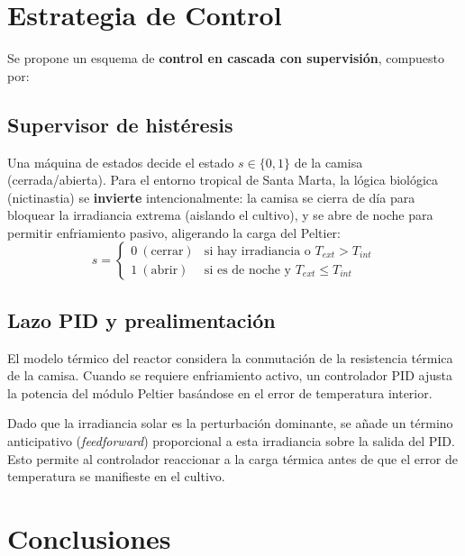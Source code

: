 \documentclass[conference]{IEEEtran}
\begin{document}
\section{Estrategia de Control}

Se propone un esquema de \textbf{control en cascada con supervisi\'on}, compuesto por:

\subsection{Supervisor de hist\'eresis}
Una m\'aquina de estados decide el estado $s \in \{0,1\}$ de la camisa
(cerrada/abierta). Para el entorno tropical de Santa Marta, la l\'ogica 
biol\'ogica (nictinastia) se \textbf{invierte} intencionalmente: la camisa se cierra 
de d\'ia para bloquear la irradiancia extrema (aislando el cultivo), y se 
abre de noche para permitir enfriamiento pasivo, aligerando la carga del Peltier:
\begin{equation}
s =
\begin{cases}
0 \ (\text{cerrar}) & \text{si hay irradiancia o } T_{ext} > T_{int} \\
1 \ (\text{abrir}) & \text{si es de noche y } T_{ext} \leq T_{int}
\end{cases}
\label{eq:supervisor}
\end{equation}

\subsection{Lazo PID y prealimentaci\'on}
El modelo t\'ermico del reactor considera la conmutaci\'on de la resistencia t\'ermica de la camisa. Cuando se requiere enfriamiento activo, un controlador PID ajusta la potencia del m\'odulo Peltier bas\'andose en el error de temperatura interior. 

Dado que la irradiancia solar es la perturbaci\'on dominante, se a\~nade un t\'ermino anticipativo (\textit{feedforward}) proporcional a esta irradiancia sobre la salida del PID. Esto permite al controlador reaccionar a la carga t\'ermica antes de que el error de temperatura se manifieste en el cultivo.

\section{Conclusiones}
\end{document}
